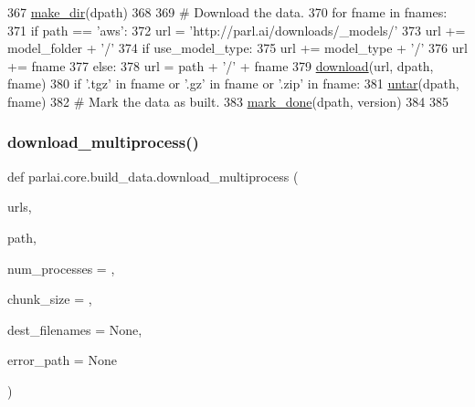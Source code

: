 \begin{DoxyCode}
367         \hyperlink{namespaceparlai_1_1core_1_1build__data_a6ce042fedd4194bd016845bbe7a8facf}{make\_dir}(dpath)
368 
369         \textcolor{comment}{# Download the data.}
370         \textcolor{keywordflow}{for} fname \textcolor{keywordflow}{in} fnames:
371             \textcolor{keywordflow}{if} path == \textcolor{stringliteral}{'aws'}:
372                 url = \textcolor{stringliteral}{'http://parl.ai/downloads/\_models/'}
373                 url += model\_folder + \textcolor{stringliteral}{'/'}
374                 \textcolor{keywordflow}{if} use\_model\_type:
375                     url += model\_type + \textcolor{stringliteral}{'/'}
376                 url += fname
377             \textcolor{keywordflow}{else}:
378                 url = path + \textcolor{stringliteral}{'/'} + fname
379             \hyperlink{namespaceparlai_1_1core_1_1build__data_ab74f0e428f05e5d91fa93c8afb367622}{download}(url, dpath, fname)
380             \textcolor{keywordflow}{if} \textcolor{stringliteral}{'.tgz'} \textcolor{keywordflow}{in} fname \textcolor{keywordflow}{or} \textcolor{stringliteral}{'.gz'} \textcolor{keywordflow}{in} fname \textcolor{keywordflow}{or} \textcolor{stringliteral}{'.zip'} \textcolor{keywordflow}{in} fname:
381                 \hyperlink{namespaceparlai_1_1core_1_1build__data_a4d33f97932682a8513904022d852f3cf}{untar}(dpath, fname)
382         \textcolor{comment}{# Mark the data as built.}
383         \hyperlink{namespaceparlai_1_1core_1_1build__data_a2527e6d29b0ccb7b841182890ac36a59}{mark\_done}(dpath, version)
384 
385 
\end{DoxyCode}
\mbox{\label{namespaceparlai_1_1core_1_1build__data_ae259aeb321a77560fbcd23028178c897}} 
\subsubsection{\texorpdfstring{download\+\_\+multiprocess()}{download\_multiprocess()}}
{\footnotesize\ttfamily def parlai.\+core.\+build\+\_\+data.\+download\+\_\+multiprocess (\begin{DoxyParamCaption}\item[{}]{urls,  }\item[{}]{path,  }\item[{}]{num\+\_\+processes = {},  }\item[{}]{chunk\+\_\+size = {},  }\item[{}]{dest\+\_\+filenames = {\ttfamily None},  }\item[{}]{error\+\_\+path = {\ttfamily None} }\end{DoxyParamCaption})}

